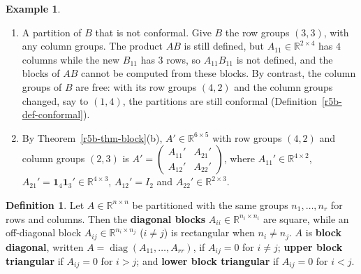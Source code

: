 \documentclass[12pt]{article}
\newcommand{\R}{\mathbb R}
\newcommand{\one}{\mathbf 1}
\DeclareMathOperator{\diag}{diag}
\theoremstyle{definition}
\newtheorem{definition}[theorem]{Definition}
\newtheorem{example}[theorem]{Example}
\begin{document}
\begin{example}
\begin{enumerate}
the sum over \(l=1,\dots,6\) splits at \(N_1=4\):
\[
(AB)_{42}=\underbrace{1\cdot0+1\cdot1+1\cdot0+1\cdot1}_{l=1,\dots,4}+\underbrace{0\cdot0+1\cdot1}_{l=5,6}=2+1=3
\]
The first part is row \(2\) of \(A_{21}\) times column \(2\) of \(B_{11}\), entry \((2,2)\) of
\(A_{21}B_{11}\); the second is row \(2\) of \(A_{22}\) times column \(2\) of \(B_{21}\), entry
\((2,2)\) of \(A_{22}B_{21}\).
\item A partition of \(B\) that is not conformal. Give \(B\) the row groups \((3,3)\), with any
column groups. The product \(AB\) is still defined, but \(A_{11}\in\R^{2\times4}\) has \(4\) columns
while the new \(B_{11}\) has \(3\) rows, so \(A_{11}B_{11}\) is not defined, and the blocks of
\(AB\) cannot be computed from these blocks. By contrast, the column groups of \(B\) are free: with its row groups
\((4,2)\) and the column groups changed, say to \((1,4)\), the partitions are still conformal
(Definition~\ref{r5b-def-conformal}).
\item By Theorem~\ref{r5b-thm-block}(b), \(A'\in\R^{6\times5}\) with row groups \((4,2)\) and
column groups \((2,3)\) is
\(A'=\left(\begin{smallmatrix}A_{11}'&A_{21}'\\A_{12}'&A_{22}'\end{smallmatrix}\right)\), where
\(A_{11}'\in\R^{4\times2}\), \(A_{21}'=\one_4\one_3'\in\R^{4\times3}\), \(A_{12}'=I_2\) and
\(A_{22}'\in\R^{2\times3}\).
\end{enumerate}
\end{example}

\begin{definition}\label{r5b-def-block-tri}
Let \(A\in\R^{n\times n}\) be partitioned with the same groups \(n_1,\dots,n_r\) for rows and
columns. Then the \textbf{diagonal blocks} \(A_{ii}\in\R^{n_i\times n_i}\) are square, while an
off-diagonal block \(A_{ij}\in\R^{n_i\times n_j}\) (\(i\ne j\)) is rectangular when
\(n_i\ne n_j\). \(A\) is \textbf{block diagonal}, written \(A=\diag(A_{11},\dots,A_{rr})\), if
\(A_{ij}=0\) for \(i\ne j\); \textbf{upper block triangular} if \(A_{ij}=0\) for \(i>j\); and
\textbf{lower block triangular} if \(A_{ij}=0\) for \(i<j\).
\end{definition}
\end{document}
